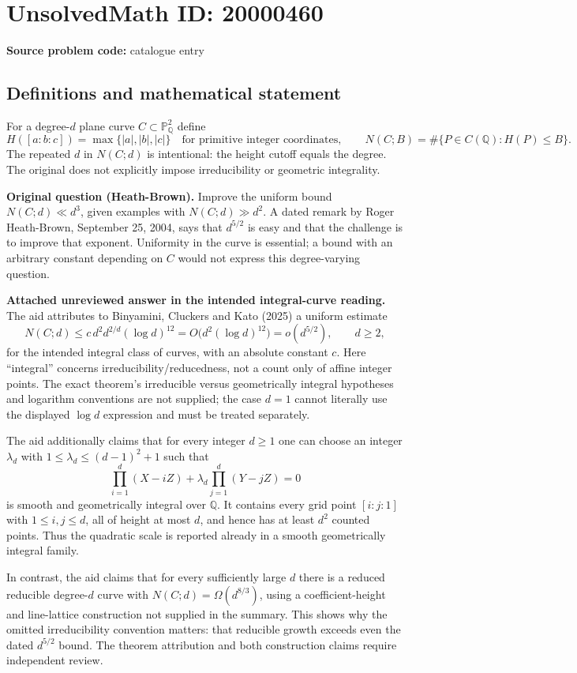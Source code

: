 \documentclass[11pt]{article}
\newcommand{\Q}{\mathbb{Q}}
\newcommand{\PP}{\mathbb{P}}
\begin{document}
\section*{UnsolvedMath ID: 20000460}
\textbf{Source problem code:} catalogue entry
\subsection{Definitions and mathematical statement}
For a degree-$d$ plane curve $C\subset\PP^2_{\Q}$ define
\[H([a:b:c])=\max\{|a|,|b|,|c|\}\quad\text{for primitive integer coordinates},\qquad N(C;B)=\#\{P\in C(\Q):H(P)\le B\}.\]
The repeated $d$ in $N(C;d)$ is intentional: the height cutoff equals the degree. The original does not explicitly impose irreducibility or geometric integrality.

\textbf{Original question (Heath-Brown).} Improve the uniform bound $N(C;d)\ll d^3$, given examples with $N(C;d)\gg d^2$. A dated remark by Roger Heath-Brown, September 25, 2004, says that $d^{5/2}$ is easy and that the challenge is to improve that exponent. Uniformity in the curve is essential; a bound with an arbitrary constant depending on $C$ would not express this degree-varying question.

\textbf{Attached unreviewed answer in the intended integral-curve reading.} The aid attributes to Binyamini, Cluckers and Kato (2025) a uniform estimate
\[N(C;d)\le c\,d^2d^{2/d}(\log d)^{12}=O\bigl(d^2(\log d)^{12}\bigr)=o(d^{5/2}),\qquad d\ge2,\]
for the intended integral class of curves, with an absolute constant $c$. Here ``integral'' concerns irreducibility/reducedness, not a count only of affine integer points. The exact theorem's irreducible versus geometrically integral hypotheses and logarithm conventions are not supplied; the case $d=1$ cannot literally use the displayed $\log d$ expression and must be treated separately.

The aid additionally claims that for every integer $d\ge1$ one can choose an integer $\lambda_d$ with $1\le\lambda_d\le(d-1)^2+1$ such that
\[\prod_{i=1}^d(X-iZ)+\lambda_d\prod_{j=1}^d(Y-jZ)=0\]
is smooth and geometrically integral over $\Q$. It contains every grid point $[i:j:1]$ with $1\le i,j\le d$, all of height at most $d$, and hence has at least $d^2$ counted points. Thus the quadratic scale is reported already in a smooth geometrically integral family.

In contrast, the aid claims that for every sufficiently large $d$ there is a reduced reducible degree-$d$ curve with $N(C;d)=\Omega(d^{8/3})$, using a coefficient-height and line-lattice construction not supplied in the summary. This shows why the omitted irreducibility convention matters: that reducible growth exceeds even the dated $d^{5/2}$ bound. The theorem attribution and both construction claims require independent review.
\end{document}
